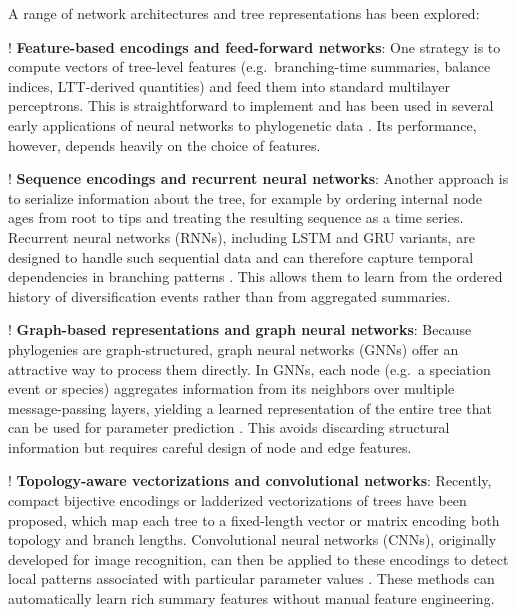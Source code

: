 

A range of network architectures and tree representations has been explored:

\begin{fancyenumerate}
    \item! \textbf{Feature-based encodings and feed-forward networks}: One strategy is to compute vectors of tree-level features (e.g.\ branching-time summaries, balance indices, LTT-derived quantities) and feed them into standard multilayer perceptrons. This is straightforward to implement and has been used in several early applications of neural networks to phylogenetic data \citep{zhu_benchmarking_2018,lambert_deep_2023}. Its performance, however, depends heavily on the choice of features.
    \item! \textbf{Sequence encodings and recurrent neural networks}: Another approach is to serialize information about the tree, for example by ordering internal node ages from root to tips and treating the resulting sequence as a time series. Recurrent neural networks (RNNs), including LSTM and GRU variants, are designed to handle such sequential data and can therefore capture temporal dependencies in branching patterns \citep{sak_long_2014,salehinejad_recent_2017}. This allows them to learn from the ordered history of diversification events rather than from aggregated summaries.
    \item! \textbf{Graph-based representations and graph neural networks}: Because phylogenies are graph-structured, graph neural networks (GNNs) offer an attractive way to process them directly. In GNNs, each node (e.g.\ a speciation event or species) aggregates information from its neighbors over multiple message-passing layers, yielding a learned representation of the entire tree that can be used for parameter prediction \citep{kipf_semi-supervised_2016,ying_hierarchical_2018,li_deepergcn_2020,rampasek_recipe_2022, lajaaiti_comparison_2023}. This avoids discarding structural information but requires careful design of node and edge features.
    \item! \textbf{Topology-aware vectorizations and convolutional networks}: Recently, compact bijective encodings or ladderized vectorizations of trees have been proposed, which map each tree to a fixed-length vector or matrix encoding both topology and branch lengths. Convolutional neural networks (CNNs), originally developed for image recognition, can then be applied to these encodings to detect local patterns associated with particular parameter values \citep{voznica_deep_2022,lambert_deep_2023,lajaaiti_comparison_2023,moi_reconstructing_2022,reiman_popphy-cnn_2020}. These methods can automatically learn rich summary features without manual feature engineering.
\end{fancyenumerate}

